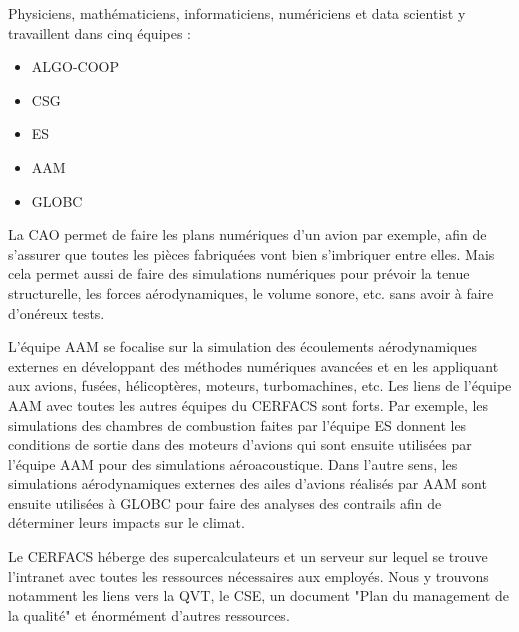 
Physiciens, mathématiciens, informaticiens, numériciens et data scientist y travaillent dans cinq équipes :


\begin{itemize}
    \item \ac{ALGO-COOP}
    \item \ac{CSG}
    \item \ac{ES}
    \item \ac{AAM}
    \item \ac{GLOBC}
\end{itemize}

\hspace{0,5cm}



La \ac{CAO} permet de faire les plans numériques d'un avion par exemple, afin de s'assurer que toutes les pièces fabriquées vont bien s'imbriquer entre elles. Mais cela permet aussi de faire des simulations numériques pour prévoir la tenue structurelle, les forces aérodynamiques, le volume sonore, etc. sans avoir à faire d'onéreux tests.

L'équipe AAM se focalise sur la simulation des écoulements aérodynamiques externes en développant des méthodes numériques avancées et en les appliquant aux avions, fusées, hélicoptères, moteurs, turbomachines, etc.
Les liens de l’équipe AAM avec toutes les autres équipes du CERFACS sont forts.
Par exemple, les simulations des chambres de combustion faites par l'équipe ES donnent les conditions de sortie dans des moteurs d'avions qui sont ensuite utilisées par l'équipe AAM pour des simulations aéroacoustique.
Dans l'autre sens, les simulations aérodynamiques externes des ailes d'avions réalisés par AAM sont ensuite utilisées à GLOBC pour faire des analyses des contrails afin de déterminer leurs impacts sur le climat.


\hspace{0,5cm}

Le CERFACS héberge des supercalculateurs et un serveur sur lequel se trouve l'intranet avec toutes les ressources nécessaires aux employés.  %
Nous y trouvons notamment les liens vers la \ac{QVT}, le \ac{CSE}, un document "Plan du management de la qualité" et énormément d'autres ressources.


